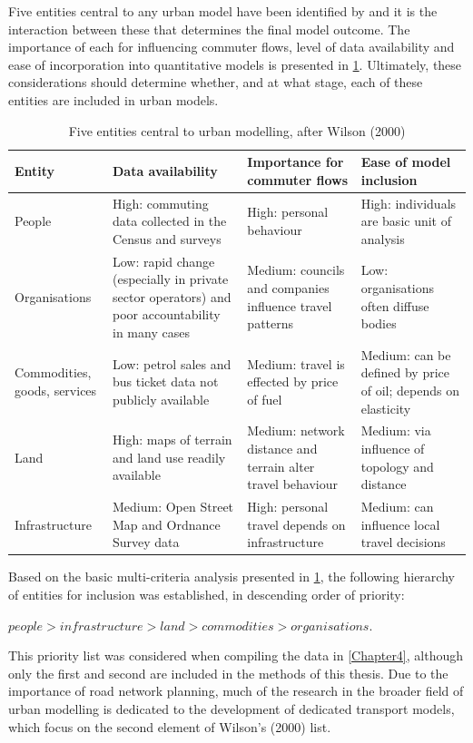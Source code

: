 \documentclass[a4paper, 11pt, twoside]{Thesis}
\begin{document}
Five entities central to any urban model have been identified
by \citet{wilson2000complex} and
it is the interaction between these that determines
the final model outcome. The importance of each
for influencing commuter flows, level of data availability and
ease of incorporation into quantitative models is presented in
\cref{t:entities}. Ultimately, these considerations should determine
whether, and at what stage, each of these entities are included in urban models.
\begin{table}[htbp]
\caption{Five entities central to urban modelling, after Wilson (2000)}
\begin{tabular}{p{2cm}p{3.5cm}p{3.5cm}p{3.5cm}} \toprule
Entity & Data availability & Importance for commuter flows & Ease of model inclusion \\ \midrule
People & High: commuting data collected in the Census and surveys & High: personal behaviour & High: individuals are basic unit of analysis \\
Organisations & Low: rapid change (especially in private sector operators) and poor accountability in many cases & Medium: councils and companies influence travel patterns & Low: organisations often
diffuse bodies \\
Commodities, goods, services & Low: petrol sales and bus ticket data not publicly available & Medium: travel is effected by price of fuel & Medium: can be defined by price of oil; depends on
elasticity \\
Land & High: maps of terrain and land use readily available & Medium: network distance and terrain alter travel behaviour & Medium: via influence of topology and distance \\
Infrastructure & Medium: Open Street Map and Ordnance Survey data & High: personal travel depends on infrastructure & Medium: can influence local travel decisions \\
\bottomrule
\end{tabular}
\label{t:entities}
\end{table}
Based on the basic multi-criteria analysis presented in
\cref{t:entities}, the following
hierarchy of entities for inclusion was established, in descending
order of priority:

$people > infrastructure > land > commodities > organisations$.

This priority list was considered when 
compiling the data in \cref{Chapter4},
although only the first and second are
included in the methods of this thesis. Due to the importance of road network
planning, much of the research in the broader field of urban modelling is
dedicated to the development of dedicated transport models, which focus on
the second element of Wilson's (2000) list.
\end{document}
